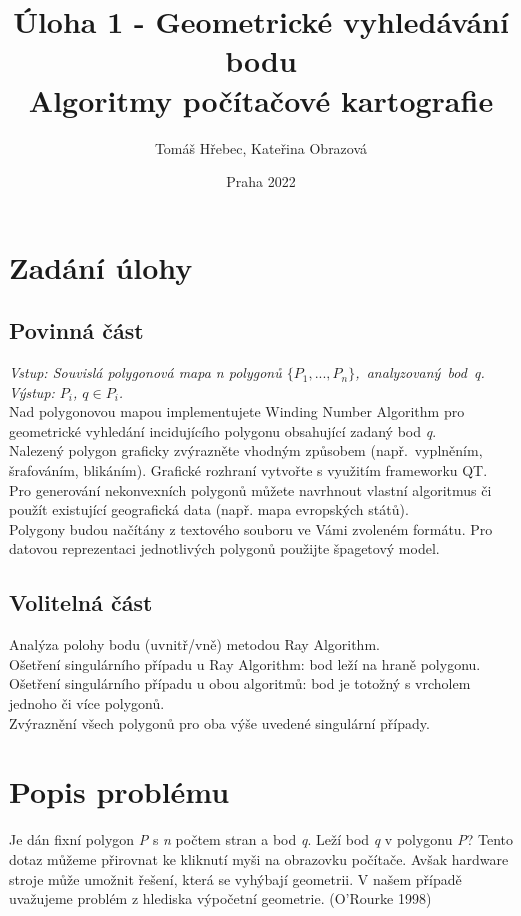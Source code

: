 \documentclass{article}
\title{%
   \Large{Úloha 1 - Geometrické vyhledávání bodu} \\
  \large{Algoritmy počítačové kartografie}}
\author{Tomáš Hřebec, Kateřina Obrazová}
\date{Praha 2022}
\begin{document}
\onehalfspacing
\maketitle
\justifying
\section{\large{Zadání úlohy}}
\subsection{\small{Povinná část}}
\textit{Vstup: Souvislá polygonová mapa n polygonů $\{P_{1}, ..., P_{n}\}$,~analyzovaný~bod~q.}
\vspace{0.2cm}\\
\textit{Výstup: $P_{i}$, $q\in P_{i}$.}
\vspace{0.2cm}\\
Nad polygonovou mapou implementujete Winding Number Algorithm pro geometrické vyhledání incidujícího polygonu obsahující zadaný bod \emph{q}.
\vspace{0.2cm}\\
Nalezený polygon graficky zvýrazněte vhodným způsobem (např.~vyplněním, šrafováním, blikáním). Grafické rozhraní vytvořte s využitím frameworku QT.
\vspace{0.2cm}\\
Pro generování nekonvexních polygonů můžete navrhnout vlastní algoritmus či použít existující geografická data (např. mapa evropských států). 
\vspace{0.2cm}\\
Polygony budou načítány z textového souboru ve Vámi zvoleném formátu. Pro datovou reprezentaci jednotlivých polygonů použijte špagetový model.
\subsection{\small{Volitelná část}}
Analýza polohy bodu (uvnitř/vně) metodou Ray Algorithm.
\vspace{0.2cm}\\
Ošetření singulárního případu u Ray Algorithm: bod leží na hraně polygonu. \vspace{0.2cm}\\
Ošetření singulárního případu u obou algoritmů: bod je totožný s vrcholem jednoho či více polygonů.
\vspace{0.2cm}\\
Zvýraznění všech polygonů pro oba výše uvedené singulární případy.
\clearpage
\newpage
\section{\large{Popis problému}}
Je dán fixní polygon \emph{P} s \emph{n} počtem stran a bod \emph{q}. Leží bod \emph{q} v polygonu \emph{P}? Tento dotaz můžeme přirovnat ke kliknutí myši na obrazovku počítače. Avšak hardware stroje může umožnit řešení, která se vyhýbají geometrii. V našem případě uvažujeme problém z hlediska výpočetní geometrie. (O'Rourke 1998) 
\end{document}
